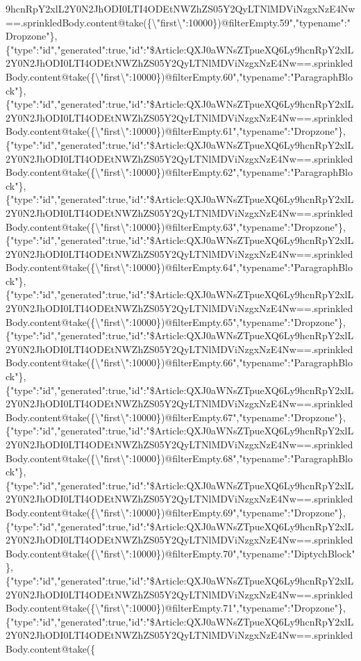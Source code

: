 9hcnRpY2xlL2Y0N2JhODI0LTI4ODEtNWZhZS05Y2QyLTNlMDViNzgxNzE4Nw==.sprinkledBody.content@take(\{\textbackslash{}"first\textbackslash{}":10000\})@filterEmpty.59","typename":"Dropzone"\},\{"type":"id","generated":true,"id":"\$Article:QXJ0aWNsZTpueXQ6Ly9hcnRpY2xlL2Y0N2JhODI0LTI4ODEtNWZhZS05Y2QyLTNlMDViNzgxNzE4Nw==.sprinkledBody.content@take(\{\textbackslash{}"first\textbackslash{}":10000\})@filterEmpty.60","typename":"ParagraphBlock"\},\{"type":"id","generated":true,"id":"\$Article:QXJ0aWNsZTpueXQ6Ly9hcnRpY2xlL2Y0N2JhODI0LTI4ODEtNWZhZS05Y2QyLTNlMDViNzgxNzE4Nw==.sprinkledBody.content@take(\{\textbackslash{}"first\textbackslash{}":10000\})@filterEmpty.61","typename":"Dropzone"\},\{"type":"id","generated":true,"id":"\$Article:QXJ0aWNsZTpueXQ6Ly9hcnRpY2xlL2Y0N2JhODI0LTI4ODEtNWZhZS05Y2QyLTNlMDViNzgxNzE4Nw==.sprinkledBody.content@take(\{\textbackslash{}"first\textbackslash{}":10000\})@filterEmpty.62","typename":"ParagraphBlock"\},\{"type":"id","generated":true,"id":"\$Article:QXJ0aWNsZTpueXQ6Ly9hcnRpY2xlL2Y0N2JhODI0LTI4ODEtNWZhZS05Y2QyLTNlMDViNzgxNzE4Nw==.sprinkledBody.content@take(\{\textbackslash{}"first\textbackslash{}":10000\})@filterEmpty.63","typename":"Dropzone"\},\{"type":"id","generated":true,"id":"\$Article:QXJ0aWNsZTpueXQ6Ly9hcnRpY2xlL2Y0N2JhODI0LTI4ODEtNWZhZS05Y2QyLTNlMDViNzgxNzE4Nw==.sprinkledBody.content@take(\{\textbackslash{}"first\textbackslash{}":10000\})@filterEmpty.64","typename":"ParagraphBlock"\},\{"type":"id","generated":true,"id":"\$Article:QXJ0aWNsZTpueXQ6Ly9hcnRpY2xlL2Y0N2JhODI0LTI4ODEtNWZhZS05Y2QyLTNlMDViNzgxNzE4Nw==.sprinkledBody.content@take(\{\textbackslash{}"first\textbackslash{}":10000\})@filterEmpty.65","typename":"Dropzone"\},\{"type":"id","generated":true,"id":"\$Article:QXJ0aWNsZTpueXQ6Ly9hcnRpY2xlL2Y0N2JhODI0LTI4ODEtNWZhZS05Y2QyLTNlMDViNzgxNzE4Nw==.sprinkledBody.content@take(\{\textbackslash{}"first\textbackslash{}":10000\})@filterEmpty.66","typename":"ParagraphBlock"\},\{"type":"id","generated":true,"id":"\$Article:QXJ0aWNsZTpueXQ6Ly9hcnRpY2xlL2Y0N2JhODI0LTI4ODEtNWZhZS05Y2QyLTNlMDViNzgxNzE4Nw==.sprinkledBody.content@take(\{\textbackslash{}"first\textbackslash{}":10000\})@filterEmpty.67","typename":"Dropzone"\},\{"type":"id","generated":true,"id":"\$Article:QXJ0aWNsZTpueXQ6Ly9hcnRpY2xlL2Y0N2JhODI0LTI4ODEtNWZhZS05Y2QyLTNlMDViNzgxNzE4Nw==.sprinkledBody.content@take(\{\textbackslash{}"first\textbackslash{}":10000\})@filterEmpty.68","typename":"ParagraphBlock"\},\{"type":"id","generated":true,"id":"\$Article:QXJ0aWNsZTpueXQ6Ly9hcnRpY2xlL2Y0N2JhODI0LTI4ODEtNWZhZS05Y2QyLTNlMDViNzgxNzE4Nw==.sprinkledBody.content@take(\{\textbackslash{}"first\textbackslash{}":10000\})@filterEmpty.69","typename":"Dropzone"\},\{"type":"id","generated":true,"id":"\$Article:QXJ0aWNsZTpueXQ6Ly9hcnRpY2xlL2Y0N2JhODI0LTI4ODEtNWZhZS05Y2QyLTNlMDViNzgxNzE4Nw==.sprinkledBody.content@take(\{\textbackslash{}"first\textbackslash{}":10000\})@filterEmpty.70","typename":"DiptychBlock"\},\{"type":"id","generated":true,"id":"\$Article:QXJ0aWNsZTpueXQ6Ly9hcnRpY2xlL2Y0N2JhODI0LTI4ODEtNWZhZS05Y2QyLTNlMDViNzgxNzE4Nw==.sprinkledBody.content@take(\{\textbackslash{}"first\textbackslash{}":10000\})@filterEmpty.71","typename":"Dropzone"\},\{"type":"id","generated":true,"id":"\$Article:QXJ0aWNsZTpueXQ6Ly9hcnRpY2xlL2Y0N2JhODI0LTI4ODEtNWZhZS05Y2QyLTNlMDViNzgxNzE4Nw==.sprinkledBody.content@take(\{\textbacksla